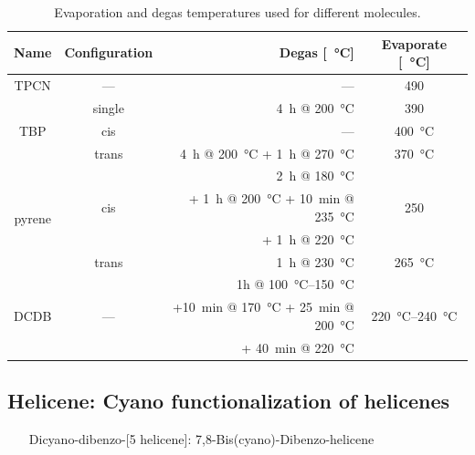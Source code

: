 \begin{table}\centering
	\caption{Evaporation and degas temperatures used for different molecules.}
	\begin{tabular}{ccrc}
		Name			& Configuration & Degas [\SI{}{\degreeCelsius}]	& Evaporate [\SI{}{\degreeCelsius}]	\\ \hline \hline 
		TPCN			& ---		& ---		& 490		\\ \hline 
		\multirow{3}{*}{TBP}	&single		& \SI{4}{\hour} @ \SI{200}{\degreeCelsius}& 390	\\
		&cis		& ---		& \SI{400}{\degreeCelsius}\\
		&trans		& \SI{4}{\hour} @ \SI{200}{\degreeCelsius} + \SI{1}{\hour} @ \SI{270}{\degreeCelsius}&\SI{370}{\degreeCelsius}\\ \hline 
		\multirow{4}{*}{pyrene} & \multirow{3}{*}{cis}		& \SI{2}{\hour} @ \SI{180}{\degreeCelsius}&	\multirow{3}{*}{250}	\\
		&&+ \SI{1}{\hour} @ \SI{200}{\degreeCelsius} + \SI{10}{\minute} @ \SI{235}{\degreeCelsius} 	&\\
		&&+ \SI{1}{\hour} @ \SI{220}{\degreeCelsius}&\\ 
		&trans		& \SI{1}{\hour} @ \SI{230}{\degreeCelsius}		&\SI{265}{\degreeCelsius}		\\ \hline
		\multirow{3}{*}{DCDB} & \multirow{3}{*}{---} & 1h @ \SIrange{100}{150}{\degreeCelsius}& \multirow{3}{*}{\SIrange{220}{240}{\degreeCelsius}}\\
		&&+\SI{10}{\minute} @ \SI{170}{\degreeCelsius} + \SI{25}{\minute} @ \SI{200}{\degreeCelsius} & \\
		&&+ \SI{40}{\minute} @ \SI{220}{\degreeCelsius}&\\
	\end{tabular}
	\label{tab:molecule-temperatures}
\end{table}


\subsection{Helicene: Cyano functionalization of helicenes}
\label{sec:helicene}
\begin{itemize}
	\item[Dicyano-dibenzo-[5]helicene]: 7,8-Bis(cyano)-Dibenzo-helicene
\end{itemize}


